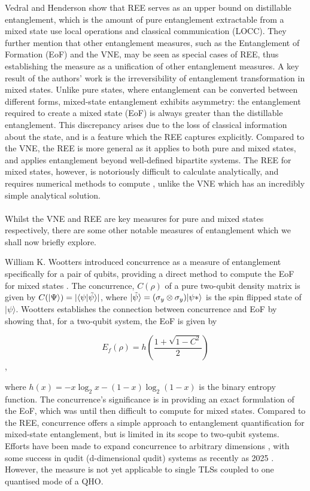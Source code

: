 \documentclass[12pt,a4paper]{article}
\begin{document}
Vedral and Henderson show that REE serves as an upper bound on distillable entanglement, which is the amount of pure entanglement extractable from a mixed state use local operations and classical communication (LOCC). They further mention that other entanglement measures, such as the Entanglement of Formation (EoF) and the VNE, may be seen as special cases of REE, thus establishing the measure as a unification of other entanglement measures. A key result of the authors' work is the irreversibility of entanglement transformation in mixed states. Unlike pure states, where entanglement can be converted between different forms, mixed-state entanglement exhibits asymmetry: the entanglement required to create a mixed state (EoF) is always greater than the distillable entanglement. This discrepancy arises due to the loss of classical information about the state, and is a feature which the REE captures explicitly. Compared to the VNE, the REE is more general as it applies to both pure and mixed states, and applies entanglement beyond well-defined bipartite systems. The REE for mixed states, however, is notoriously difficult to calculate analytically, and requires numerical methods to compute \cite{Entanglement2009-REE_VNapplied}, unlike the VNE which has an incredibly simple analytical solution. \\
\\
Whilst the VNE and REE are key measures for pure and mixed states respectively, there are some other notable measures of entanglement which we shall now briefly explore. 

William K. Wootters introduced concurrence as a measure of entanglement specifically for a pair of qubits, providing a direct method to compute the EoF for mixed states \cite{Entanglement2001-WC_qubits}. The concurrence, $C(\rho)$ of a pure two-qubit density matrix is given by $C(|\Psi\rangle) = |\langle\psi|\Tilde{\psi}\rangle|$, where $|\Tilde{\psi}\rangle = (\sigma_y\otimes\sigma_y)|\psi*\rangle$ is the spin flipped state of $|\psi\rangle$. Wootters establishes the connection between concurrence and EoF by showing that, for a two-qubit system, the EoF is given by

\begin{equation}
    E_f(\rho) = h\left(\frac{1+\sqrt{1-C^2}}{2}\right)
\end{equation}, 

where $h(x) = - x\log_2x - (1 - x)\log_2(1 -x)$ is the binary entropy function. The concurrence's significance is in providing an exact formulation of the EoF, which was until then difficult to compute for mixed states. Compared to the REE, concurrence offers a simple approach to entanglement quantification for mixed-state entanglement, but is limited in its scope to two-qubit systems. Efforts have been made to expand concurrence to arbitrary dimensions \cite{Entanglement2001-WC_arbdim}, with some success in qudit (d-dimensional qudit) systems as recently as 2025 \cite{Entanglement2025_WC_arbidm_example}. However, the measure is not yet applicable to single TLSs coupled to one quantised mode of a QHO.
\end{document}
